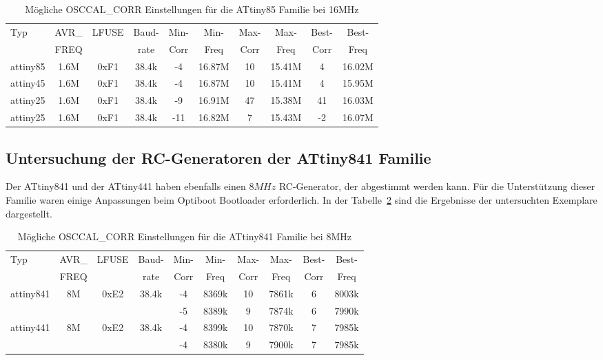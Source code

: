\begin{table}[H]
  \begin{center}
    \begin{tabular}{| l | c | c | c || c | c || c | c || c | c |}
    \hline
   Typ  &       AVR\_ & LFUSE & Baud- & Min- & Min- & Max- & Max- & Best- & Best-  \\
        &       FREQ  &       & rate & Corr & Freq & Corr & Freq  & Corr  & Freq  \\
    \hline
    \hline
attiny85 &         1.6M & 0xF1  & 38.4k &  -4  & 16.87M &  10  & 15.41M  & 4  & 16.02M \\
    \hline
attiny45  &        1.6M & 0xF1  & 38.4k &  -4  & 16.87M & 10  & 15.41M  & 4  & 15.95M \\
    \hline
attiny25  &        1.6M & 0xF1  & 38.4k &  -9   & 16.91M & 47 & 15.38M  & 41  & 16.03M \\
attiny25  &        1.6M & 0xF1  & 38.4k &  -11  & 16.82M & 7  & 15.43M  & -2  & 16.07M \\
    \hline
    \end{tabular}
  \end{center}
  \caption{Mögliche OSCCAL\_CORR Einstellungen für die ATtiny85 Familie bei 16MHz}
  \label{tab:tiny85freq16}
\end{table}

\subsection{Untersuchung der RC-Generatoren der ATtiny841 Familie}

Der ATtiny841 und der ATtiny441 haben ebenfalls einen \(8MHz\) RC-Generator,
der abgestimmt werden kann. Für die Unterstützung dieser Familie waren einige
Anpassungen beim Optiboot Bootloader erforderlich.
In der Tabelle~\ref{tab:tiny841freq8} sind die Ergebnisse der untersuchten Exemplare
dargestellt.

\begin{table}[H]
  \begin{center}
    \begin{tabular}{| l | c | c | c || c | c || c | c || c | c |}
    \hline
   Typ  &       AVR\_ & LFUSE & Baud- & Min- & Min- & Max- & Max- & Best- & Best-  \\
        &       FREQ  &       & rate & Corr & Freq & Corr & Freq  & Corr  & Freq  \\
    \hline
    \hline
attiny841 &          8M & 0xE2  & 38.4k &  -4  & 8369k & 10  & 7861k  & 6  & 8003k \\
          &             &       &       &  -5  & 8389k &  9  & 7874k  & 6  & 7990k \\
    \hline
attiny441  &         8M & 0xE2  & 38.4k &  -4  & 8399k & 10 & 7870k  & 7  & 7985k \\
           &            &       &       &  -4  & 8380k &  9 & 7900k  & 7  & 7985k \\
    \hline
    \end{tabular}
  \end{center}
  \caption{Mögliche OSCCAL\_CORR Einstellungen für die ATtiny841 Familie bei 8MHz}
  \label{tab:tiny841freq8}
\end{table}

